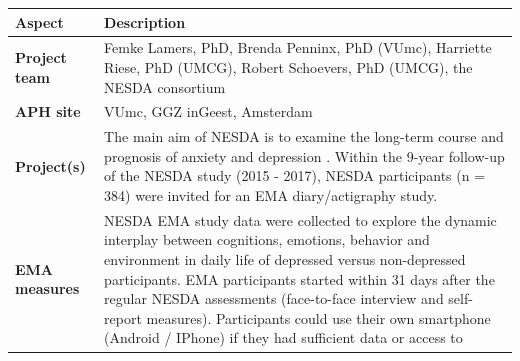 \documentclass[]{book}
\begin{document}
\begin{longtable}[]{@{}ll@{}}
\toprule
\begin{minipage}[b]{0.25\columnwidth}\raggedright\strut
\textbf{Aspect}\strut
\end{minipage} & \begin{minipage}[b]{0.69\columnwidth}\raggedright\strut
\textbf{Description}\strut
\end{minipage}\tabularnewline
\midrule
\endhead
\begin{minipage}[t]{0.25\columnwidth}\raggedright\strut
\textbf{Project team}\strut
\end{minipage} & \begin{minipage}[t]{0.69\columnwidth}\raggedright\strut
Femke Lamers, PhD, Brenda Penninx, PhD (VUmc), Harriette Riese, PhD
(UMCG), Robert Schoevers, PhD (UMCG), the NESDA consortium\strut
\end{minipage}\tabularnewline
\begin{minipage}[t]{0.25\columnwidth}\raggedright\strut
\textbf{APH site}\strut
\end{minipage} & \begin{minipage}[t]{0.69\columnwidth}\raggedright\strut
VUmc, GGZ inGeest, Amsterdam\strut
\end{minipage}\tabularnewline
\begin{minipage}[t]{0.25\columnwidth}\raggedright\strut
\textbf{Project(s)}\strut
\end{minipage} & \begin{minipage}[t]{0.69\columnwidth}\raggedright\strut
The main aim of NESDA is to examine the long-term course and prognosis
of anxiety and depression \citep{Penninx2008}. Within the 9-year
follow-up of the NESDA study (2015 - 2017), NESDA participants (n = 384)
were invited for an EMA diary/actigraphy study.\strut
\end{minipage}\tabularnewline
\begin{minipage}[t]{0.25\columnwidth}\raggedright\strut
\textbf{EMA measures}\strut
\end{minipage} & \begin{minipage}[t]{0.69\columnwidth}\raggedright\strut
NESDA EMA study data were collected to explore the dynamic interplay
between cognitions, emotions, behavior and environment in daily life of
depressed versus non-depressed participants. EMA participants started
within 31 days after the regular NESDA assessments (face-to-face
interview and self-report measures). Participants could use their own
smartphone (Android / IPhone) if they had sufficient data or access to

\end{minipage}
\end{longtable}
\end{document}
